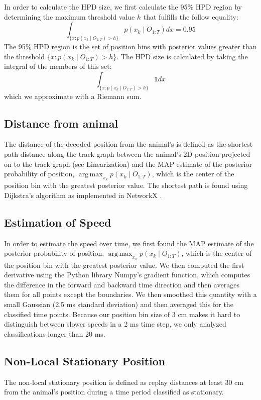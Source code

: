 \documentclass[9pt,lineno]{elife}
\DeclareMathOperator*{\argmax}{arg\,max}
\begin{document}
In order to calculate the HPD size, we first calculate the 95\% HPD region by determining the maximum threshold value $h$ that fulfills the follow equality:
$$
\int_{\{x: p(x_{k} \mid O_{1:T}) > h\}} p(x_{k} \mid O_{1:T})dx = 0.95
$$
The 95\% HPD region is the set of position bins with posterior values greater than the threshold $\{x : p(x_{k} \mid O_{1:T}) > h\}$. The HPD size is calculated by taking the integral of the members of this set:
$$
\int_{\{x: p(x_{k} \mid O_{1:T}) > h\}} \mathbb{1}dx
$$
which we approximate with a Riemann sum.

\subsection*{Distance from animal}
The distance of the decoded position from the animal's is defined as the shortest path distance along the track graph between the animal's 2D position projected on to the track graph (see Linearization) and the MAP estimate of the posterior probability of position, $\argmax_{x_k} p(x_{k} \mid O_{1:T})$, which is the center of the position bin with the greatest posterior value. The shortest path is found using Dijkstra's algorithm \citep{Dijkstranotetwoproblems1959} as implemented in NetworkX \citep{HagbergExploringNetworkStructure2008}.

\subsection*{Estimation of Speed}
In order to estimate the speed over time, we first found the MAP estimate of the posterior probability of position, $\argmax_{x_k} p(x_{k} \mid O_{1:T})$, which is the center of the position bin with the greatest posterior value. We then computed the first derivative using the Python library Numpy's gradient function, which computes the difference in the forward and backward time direction and then averages them for all points except the boundaries. We then smoothed this quantity with a small Gaussian (2.5 ms standard deviation) and then averaged this for the classified time points. Because our position bin size of 3 cm makes it hard to distinguish between slower speeds in a 2 ms time step, we only analyzed classifications longer than 20 ms.

\subsection*{Non-Local Stationary Position}
The non-local stationary position is defined as replay distances at least 30 cm from the animal's position during a time period classified as stationary.
\end{document}
